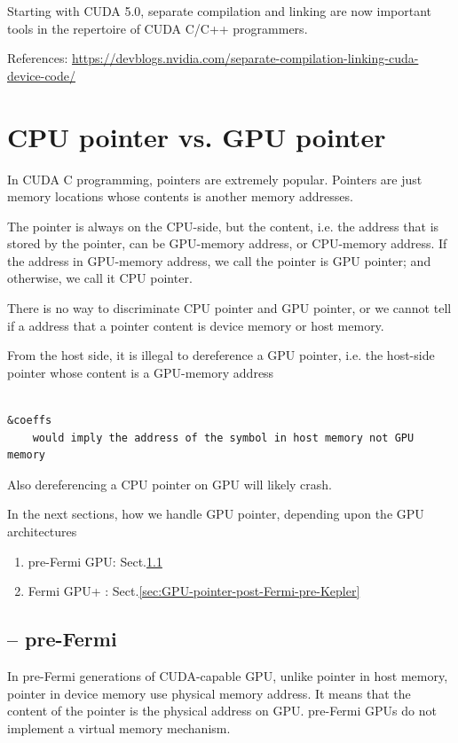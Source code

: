 Starting with CUDA 5.0, separate compilation and linking are now important tools
in the repertoire of CUDA C/C++ programmers.



References: \url{https://devblogs.nvidia.com/separate-compilation-linking-cuda-device-code/}




\section{CPU pointer vs. GPU pointer}
\label{sec:cpu-pointer-vs}

In CUDA C programming, pointers are extremely popular. Pointers are just memory
locations whose contents is another memory addresses.  

The pointer is always on the CPU-side, but the content, i.e. the address that is
stored by the pointer, can be GPU-memory address, or CPU-memory address.
If the address in GPU-memory address, we call the pointer is GPU pointer; and
otherwise, we call it CPU pointer.

There is no way to discriminate CPU pointer and GPU pointer, or we cannot tell
if a address that a pointer content is device memory or host memory.

From the host side,  it is illegal to dereference a GPU pointer, i.e. the
host-side pointer whose content is a GPU-memory address
\begin{verbatim}

&coeffs 
    would imply the address of the symbol in host memory not GPU memory
\end{verbatim}
Also dereferencing a CPU pointer on GPU will likely crash.

In the next sections, how we handle GPU pointer, depending upon the GPU architectures
\begin{enumerate}
  \item pre-Fermi GPU: Sect.\ref{sec:GPU-pointer-pre-Fermi}
  
  \item Fermi GPU+ : Sect.\ref{sec:GPU-pointer-post-Fermi-pre-Kepler}
\end{enumerate}

\subsection{-- pre-Fermi}
\label{sec:GPU-pointer-pre-Fermi}

In pre-Fermi generations of CUDA-capable GPU, unlike pointer in host memory,
pointer in device memory use physical memory address. It means that the content
of the pointer is the physical address on GPU. pre-Fermi GPUs do not implement a
virtual memory mechanism.

